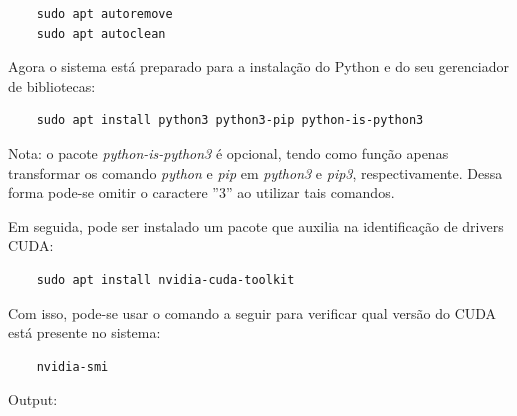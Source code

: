 \documentclass[
    12pt,
    openright,
    oneside,
    a4paper,
    english,
    brazil,
]{abntex2}
\begin{document}
\begin{verbatim}
    sudo apt autoremove
    sudo apt autoclean
\end{verbatim}

Agora o sistema está preparado para a instalação do Python e do seu gerenciador de bibliotecas:

\begin{verbatim}
    sudo apt install python3 python3-pip python-is-python3
\end{verbatim}

Nota: o pacote \emph{python-is-python3} é opcional, tendo como função apenas transformar os comando \emph{python} e \emph{pip} em \emph{python3} e \emph{pip3}, respectivamente. Dessa forma pode-se omitir o caractere ''3'' ao utilizar tais comandos.

Em seguida, pode ser instalado um pacote que auxilia na identificação de drivers CUDA:

\begin{verbatim}
    sudo apt install nvidia-cuda-toolkit
\end{verbatim}

Com isso, pode-se usar o comando a seguir para verificar qual versão do CUDA está presente no sistema:

\begin{verbatim}
    nvidia-smi
\end{verbatim}

Output:
\end{document}
